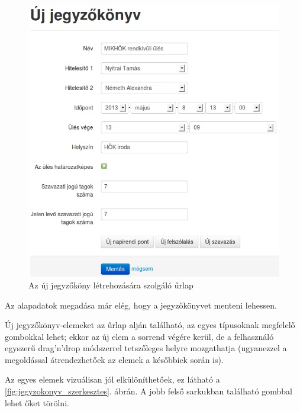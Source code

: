 \documentclass[a4paper,12pt,oneside]{report}
\begin{document}
\begin{figure}[h]
    \centering
    \includegraphics[width=\textwidth]{jegyzokonyv_uj.png}
    \caption{Az új jegyzőköny létrehozására szolgáló űrlap}
    \label{fig:jegyzokonyv_uj}
\end{figure}

Az alapadatok megadása már elég, hogy a jegyzőkönyvet menteni lehessen.

Új jegyzőkönyv-elemeket az űrlap alján található, az egyes típusoknak megfelelő gombokkal lehet; ekkor az új elem a sorrend végére kerül, de a felhasználó egyszerű drag'n'drop módszerrel tetszőleges helyre mozgathatja (ugyanezzel a megoldással átrendezhetőek az elemek a későbbiek során is).

Az egyes elemek vizuálisan jól elkülöníthetőek, ez látható a \ref{fig:jegyzokonyv_szerkesztes}. ábrán. A jobb felső sarkukban található gombbal lehet őket törölni.
\end{document}
